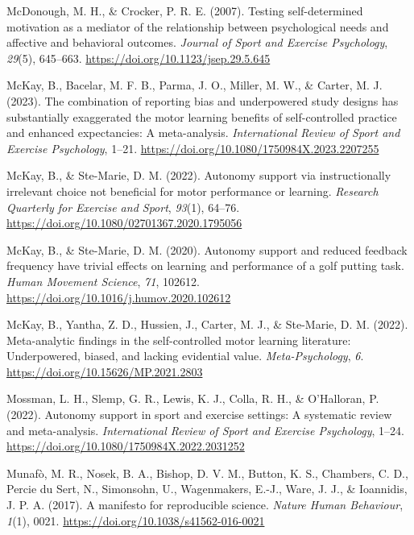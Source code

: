 \documentclass[
  doc, donotrepeattitle,floatsintext]{apa7}
\newlength{\cslhangindent}
\newlength{\cslentryspacingunit} %
\newenvironment{CSLReferences}[2] %
 {%
  \setlength{\parindent}{0pt}
  \ifodd #1
  \let\oldpar\par
  \def\par{\hangindent=\cslhangindent\oldpar}
  \fi
  \setlength{\parskip}{#2\cslentryspacingunit}
 }%
 {}
\begin{document}
\begin{CSLReferences}{1}{0}
\leavevmode{}%
McDonough, M. H., \& Crocker, P. R. E. (2007). Testing self-determined motivation as a mediator of the relationship between psychological needs and affective and behavioral outcomes. \emph{Journal of Sport and Exercise Psychology}, \emph{29}(5), 645--663. \url{https://doi.org/10.1123/jsep.29.5.645}

\leavevmode{}%
McKay, B., Bacelar, M. F. B., Parma, J. O., Miller, M. W., \& Carter, M. J. (2023). The combination of reporting bias and underpowered study designs has substantially exaggerated the motor learning benefits of self-controlled practice and enhanced expectancies: A meta-analysis. \emph{International Review of Sport and Exercise Psychology}, 1--21. \url{https://doi.org/10.1080/1750984X.2023.2207255}

\leavevmode{}%
McKay, B., \& Ste-Marie, D. M. (2022). Autonomy support via instructionally irrelevant choice not beneficial for motor performance or learning. \emph{Research Quarterly for Exercise and Sport}, \emph{93}(1), 64--76. \url{https://doi.org/10.1080/02701367.2020.1795056}

\leavevmode{}%
McKay, B., \& Ste-Marie, D. M. (2020). Autonomy support and reduced feedback frequency have trivial effects on learning and performance of a golf putting task. \emph{Human Movement Science}, \emph{71}, 102612. \url{https://doi.org/10.1016/j.humov.2020.102612}

\leavevmode{}%
McKay, B., Yantha, Z. D., Hussien, J., Carter, M. J., \& Ste-Marie, D. M. (2022). Meta-analytic findings in the self-controlled motor learning literature: {Underpowered}, biased, and lacking evidential value. \emph{Meta-Psychology}, \emph{6}. \url{https://doi.org/10.15626/MP.2021.2803}

\leavevmode{}%
Mossman, L. H., Slemp, G. R., Lewis, K. J., Colla, R. H., \& O'Halloran, P. (2022). Autonomy support in sport and exercise settings: {A} systematic review and meta-analysis. \emph{International Review of Sport and Exercise Psychology}, 1--24. \url{https://doi.org/10.1080/1750984X.2022.2031252}

\leavevmode{}%
Munafò, M. R., Nosek, B. A., Bishop, D. V. M., Button, K. S., Chambers, C. D., Percie du Sert, N., Simonsohn, U., Wagenmakers, E.-J., Ware, J. J., \& Ioannidis, J. P. A. (2017). A manifesto for reproducible science. \emph{Nature Human Behaviour}, \emph{1}(1), 0021. \url{https://doi.org/10.1038/s41562-016-0021}


\end{CSLReferences}
\end{document}
